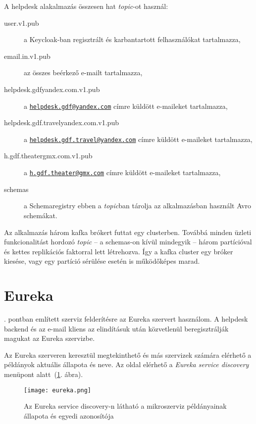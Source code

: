 A helpdesk alakalmazás összesen hat \textit{topic}-ot használ:
\begin{description}
	\item[user.v1.pub] a Keycloak-ban regisztrált és karbantartott felhasználókat tartalmazza,
	
	\item[email.in.v1.pub] az összes beérkező  e-mailt tartalmazza,
	
	\item[helpdesk.gdf\textunderscore yandex.com.v1.pub] a  \href{mailto:helpdesk.gdf@yandex.com}{\nolinkurl{helpdesk.gdf@yandex.com}} címre küldött e-maileket tartalmazza,
	
	\item[helpdesk.gdf.travel\textunderscore yandex.com.v1.pub] a \href{mailto:helpdesk.gdf.travel@yandex.com}{\nolinkurl{helpdesk.gdf.travel@yandex.com}} címre küldött e-maileket tartalmazza,
	
	
	\item[h.gdf.theater\textunderscore gmx.com.v1.pub] a \href{mailto:h.gdf.theater@gmx.com}{\nolinkurl{h.gdf.theater@gmx.com}} címre küldött e-maileket tartalmazza,
	
	\item[\textunderscore schemas] a Schemaregistry ebben a \textit{topic}ban tárolja az alkalmazásban használt Avro schemákat.
\end{description}


Az alkalmazás három kafka brókert futtat egy clusterben. Továbbá minden üzleti funkcionalitást hordozó \textit{topic} --  a \textunderscore schemas-on kívül mindegyik --   három partícióval és kettes replikációs faktorral lett létrehozva.
Így a kafka cluster egy bróker kiesése, vagy egy partíció sérülése esetén is működőképes marad.


\section{Eureka}
. pontban említett szerviz felderítésre az Eureka szervert használom. A helpdesk backend és az e-mail kliens az elindításuk után közvetlenül beregisztrálják magukat az Eureka szervizbe.

Az Eureka szerveren keresztül megtekinthető és más szervizek számára elérhető a példányok aktuális állapota és neve. Az oldal elérhető a \textit{Eureka service discovery} menüpont alatt~(\ref{fig:eureka}. ábra).


\begin{figure}[hbt] 
	\centering
	\texttt{[image: eureka.png]}
	\caption[Az Eureka service discovery felülete]{Az Eureka service discovery-n látható a mikroszerviz példányainak állapota és egyedi azonosítója}
	\label{fig:eureka}
\end{figure}

